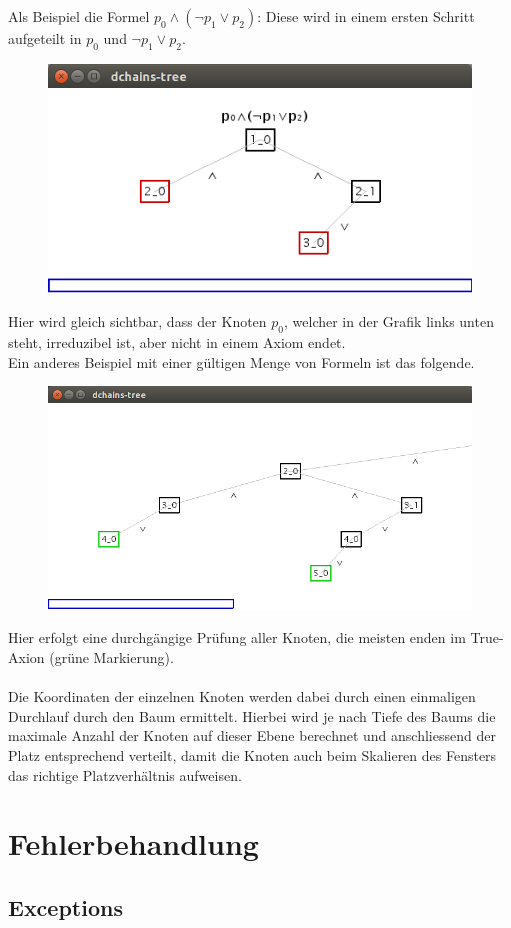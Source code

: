 \documentclass[11pt,a4paper,ngerman]{scrreprt}
\begin{document}
\newpage \noindent Als Beispiel die Formel $p_0 \wedge ( \neg p_1 \vee p_2 )$: Diese wird in einem ersten Schritt aufgeteilt in $p_0$ und $\neg p_1 \vee p_2$.
\begin{figure}[ht]
\centering
\includegraphics[width=.6\linewidth]{pics/tree1.png}
\end{figure}
Hier wird gleich sichtbar, dass der Knoten $p_0$, welcher in der Grafik links unten steht, irreduzibel ist, aber nicht in einem Axiom endet. \\
Ein anderes Beispiel mit einer gültigen Menge von Formeln ist das folgende. 
\begin{figure}[ht]
\centering
\includegraphics[width=.8\linewidth]{pics/tree2.png}
\end{figure}
Hier erfolgt eine durchgängige Prüfung aller Knoten, die meisten enden im True-Axion (grüne Markierung). \\\\
Die Koordinaten der einzelnen Knoten werden dabei durch einen einmaligen Durchlauf durch den Baum ermittelt. Hierbei wird je nach Tiefe des Baums die maximale Anzahl der Knoten auf dieser Ebene berechnet und anschliessend der Platz entsprechend verteilt, damit die Knoten auch beim Skalieren des Fensters das richtige Platzverhältnis aufweisen.

\section{Fehlerbehandlung}
\label{section:fehlerbehandlung}
\subsection{Exceptions}
\end{document}
